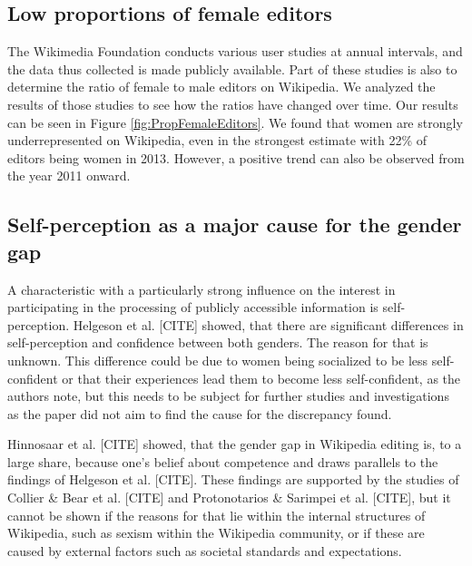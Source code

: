 \documentclass[a4paper, 11pt]{article}
\begin{document}
\subsection{Low proportions of female editors} \label{sec:gender-gap-wikipedia:prop-female-editors}
The Wikimedia Foundation conducts various user studies at annual intervals, and the data thus collected is made publicly available. Part of these studies is also to determine the ratio of female to male editors on Wikipedia. We analyzed the results of those studies to see how the ratios have changed over time. Our results can be seen in Figure \ref{fig:PropFemaleEditors}. We found that women are strongly underrepresented on Wikipedia, even in the strongest estimate with 22\% of editors being women in 2013. However, a positive trend can also be observed from the year 2011 onward.

\subsection{Self-perception as a major cause for the gender gap} \label{sec:gender-gap-wikipedia:self-perception}
A characteristic with a particularly strong influence on the interest in participating in the processing of publicly accessible information is self-perception. Helgeson et al. [CITE] showed, that there are significant differences in self-perception and confidence between both genders. The reason for that is unknown. This difference could be due to women being socialized to be less self-confident or that their experiences lead them to become less self-confident, as the authors note, but this needs to be subject for further studies and investigations as the paper did not aim to find the cause for the discrepancy found.

Hinnosaar et al. [CITE] showed, that the gender gap in Wikipedia editing is, to a large share, because one’s belief about competence and draws parallels to the findings of Helgeson et al. [CITE]. These findings are supported by the studies of Collier \& Bear et al. [CITE] and Protonotarios \& Sarimpei et al. [CITE], but it cannot be shown if the reasons for that lie within the internal structures of Wikipedia, such as sexism within the Wikipedia community, or if these are caused by external factors such as societal standards and expectations.
\end{document}
